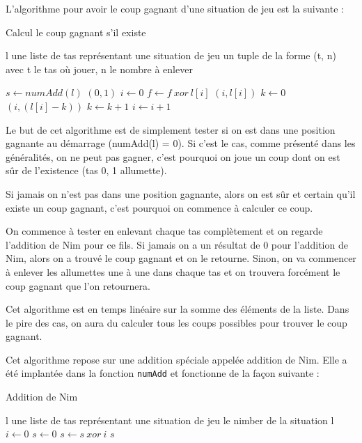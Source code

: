 L'algorithme pour avoir le coup gagnant d'une situation de jeu est la suivante :
\clearpage
\begin{algorithm}[hbt]
  \caption{Calcul le coup gagnant s'il existe}
  \begin{algorithmic}
    \REQUIRE l une liste de tas représentant une situation de jeu
    \ENSURE un tuple de la forme (t, n) avec t le tas où jouer, n le nombre à enlever
    
    \STATE $s \leftarrow numAdd(l)$
      \RETURN $(0, 1)$
    \ELSE
      \STATE $i \leftarrow 0$
        \STATE $f \leftarrow f\ xor\ l[i]$
          \RETURN $(i, l[i])$
        \ELSE
          \STATE $k \leftarrow 0$
              \RETURN $(i, (l[i] - k))$
            \ELSE
              \STATE $k \leftarrow k + 1$
            \ENDIF
          \ENDWHILE
        \ENDIF
        \STATE $i \leftarrow i + 1$
      \ENDWHILE
    \ENDIF
  \end{algorithmic}
\end{algorithm}    

Le but de cet algorithme est de simplement tester si on est dans une position gagnante au démarrage (numAdd(l) = 0). Si c'est le cas, comme présenté dans les généralités, on ne peut pas gagner, c'est pourquoi on joue un coup dont on est sûr de l'existence (tas 0, 1 allumette).

Si jamais on n'est pas dans une position gagnante, alors on est sûr et certain qu'il existe un coup gagnant, c'est pourquoi on commence à calculer ce coup.

On commence à tester en enlevant chaque tas complètement et on regarde l'addition de Nim pour ce fils. Si jamais on a un résultat de 0 pour l'addition de Nim, alors on a trouvé le coup gagnant et on le retourne. Sinon, on va commencer à enlever les allumettes une à une dans chaque tas et on trouvera forcément le coup gagnant que l'on retournera.

Cet algorithme est en temps linéaire sur la somme des éléments de la liste. Dans le pire des cas, on aura du calculer tous les coups possibles pour trouver le coup gagnant.

Cet algorithme repose sur une addition spéciale appelée addition de Nim. Elle a été implantée dans la fonction \texttt{numAdd} et fonctionne de la façon suivante :

\begin{algorithm}[hbt]
  \caption{Addition de Nim}
  \begin{algorithmic}[h]
    \REQUIRE l une liste de tas représentant une situation de jeu
    \ENSURE le nimber de la situation l
    \STATE $i \leftarrow 0$
    \STATE $s \leftarrow 0$
      \STATE $s \leftarrow s\ xor\ i$
    \ENDFOR
    \RETURN $s$
  \end{algorithmic}
\end{algorithm}

